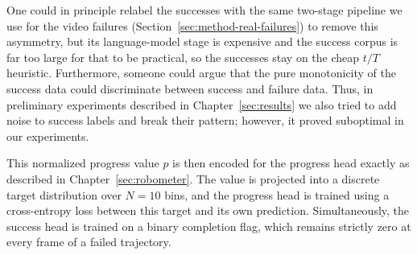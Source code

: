 One could in principle relabel the successes with the same two-stage pipeline we use for the video failures (Section~\ref{sec:method-real-failures}) to remove this asymmetry, but its language-model stage is expensive and the success corpus is far too large for that to be practical, so the successes stay on the cheap $t/T$ heuristic. Furthermore, someone could argue that the pure monotonicity of the success data could discriminate between success and failure data. Thus, in preliminary experiments described in Chapter~\ref{sec:results} we also tried to add noise to success labels and break their pattern; however, it proved suboptimal in our experiments.

This normalized progress value $p$ is then encoded for the progress head exactly as described in Chapter~\ref{sec:robometer}. The value is projected into a discrete target distribution over $N=10$ bins, and the progress head is trained using a cross-entropy loss between this target and its own prediction. Simultaneously, the success head is trained on a binary completion flag, which remains strictly zero at every frame of a failed trajectory.

